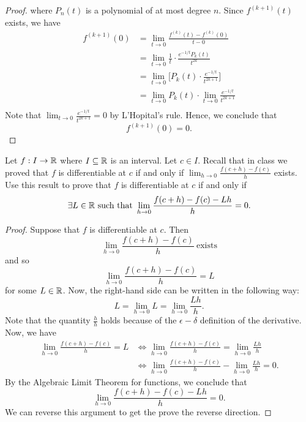\documentclass[a4paper]{article}
\begin{document}
\begin{proof}
where \( {P}_{n}(t) \) is a polynomial of at most degree \( n \).
Since \( f^{(k+1)}(t) \) exists, we have 
\begin{align*}
    f^{(k+1)}(0) &= \lim_{ t  \to 0 }  \frac{ f^{(k)}(t) - f^{(k)}(0)  }{t - 0  }  \\
            &= \lim_{ t \to 0 }  \frac{ 1 }{ t }  \cdot \frac{ e^{-1/t} {P}_{k}(t)  }{ t^{2k} } \\
            &= \lim_{ t \to 0  } \Big[ {P}_{k}(t) \cdot \frac{ e^{-1/t} }{ t^{2k+1} } \Big] \\
            &= \lim_{ t \to 0  }  {P}_{k}(t) \cdot \lim_{ t \to 0 }  \frac{ e^{-1/t} }{ t^{2k+1} }  \\
\end{align*}
Note that \( \lim_{ t \to 0  }  \frac{ e^{-1/t} }{ t^{2k+1} }  = 0  \) by L'Hopital's rule. Hence, we conclude that 
\[  f^{(k+1)}(0) = 0. \]

\end{proof}

\begin{problem}
   Let \( f: I \to \mathbb{R}  \) where \( I \subseteq  \mathbb{R}   \) is an interval. Let \( c \in I  \). Recall that in class we proved that \( f  \) is differentiable at \( c  \) if and only if \( \displaystyle \lim_{ h \to 0 } \frac{ f(c+h)  - f(c) }{ h }  \) exists. Use this result to prove that \( f  \) is differentiable at \( c  \) if and only if  
   \[  \exists L \in \R \ \text{such that} \ \lim_{ h \to 0 } \frac{ f(c+h) - f(c) - Lh }{ h } = 0. \]
\end{problem}
\begin{proof}
Suppose that \( f  \) is differentiable at \( c  \). Then
\[  \lim_{ h \to 0 }  \frac{ f(c+h) - f(c) }{ h  } \ \text{exists}    \]
and so 
\[  \lim_{ h \to 0 }  \frac{ f(c+h) - f(c) }{ h  } = L  \]
for some \( L \in \mathbb{R}  \). Now, the right-hand side can be written in the following way:
\[  L = \lim_{ h \to 0 }  L = \lim_{ h \to 0 }   \frac{ L h }{ h }.  \]
Note that the quantity \( \frac{ h }{ h }  \) holds because of the \( \epsilon-\delta \) definition of the derivative. Now, we have 
\begin{align*}
    \lim_{ h \to 0 }  \frac{ f(c+h) - f(c) }{ h   } = L  &\iff \lim_{ h \to 0 }  \frac{ f(c+h) - f(c) }{ h  } = \lim_{ h \to 0 } \frac{L h }{ h }  \\
                                                         &\iff \lim_{ h \to 0 }  \frac{ f(c+h) - f(c) }{ h }  - \lim_{ h \to 0 } \frac{ Lh  }{ h } = 0.
\end{align*}
By the Algebraic Limit Theorem for functions, we conclude that 
\[  \lim_{ h \to 0 } \frac{ f(c+h) - f(c) - Lh }{ h } = 0. \]
We can reverse this argument to get the prove the reverse direction.
\end{proof}
\end{document}
